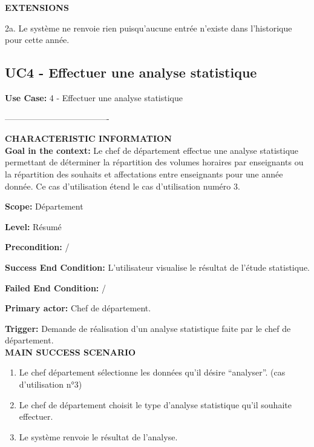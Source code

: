  \noindent\textbf{EXTENSIONS}
 \begin{list}{}{}
 \item 2a. Le système ne renvoie rien puisqu'aucune entrée n'existe dans l'historique pour cette année.\\
 \end{list}



 \subsection{UC4 - Effectuer une analyse statistique}

 \noindent\textbf{Use Case:} 4 - Effectuer une analyse statistique 

 \noindent\--------------------------------------

 \noindent\textbf{CHARACTERISTIC INFORMATION}\\

 \noindent \textbf{Goal in the context:}
 Le chef de département effectue une analyse statistique permettant de déterminer la répartition des volumes horaires par enseignants ou la répartition des souhaits et affectations entre enseignants pour une année donnée. Ce cas d'utilisation étend le cas d'utilisation numéro 3.

 \noindent\textbf{Scope:}
 Département

 \noindent\textbf{Level:}
 Résumé

 \noindent\textbf{Precondition:}
 /

 \noindent\textbf{Success End Condition:}
 L'utilisateur visualise le résultat de l'étude statistique.

 \noindent\textbf{Failed End Condition:}
 /

 \noindent\textbf{Primary actor:}
 Chef de département.

 \noindent\textbf{Trigger:}
 Demande de réalisation d'un analyse statistique faite par le chef de département.\\

 \noindent\textbf{MAIN SUCCESS SCENARIO}
 \begin{enumerate}
 \item Le chef département sélectionne les données qu'il désire ``analyser''. (cas d'utilisation n°3)
 \item Le chef de département choisit le type d'analyse statistique qu'il souhaite effectuer.
 \item Le système renvoie le résultat de l'analyse.\\
 \end{enumerate}

